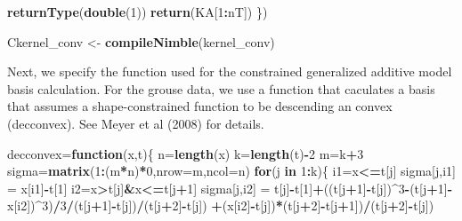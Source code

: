 \documentclass[11pt,]{article}
\newenvironment{Shaded}{\begin{snugshade}}{\end{snugshade}}
\newcommand{\KeywordTok}[1]{\textcolor[rgb]{0.13,0.29,0.53}{\textbf{#1}}}
\newcommand{\DataTypeTok}[1]{\textcolor[rgb]{0.13,0.29,0.53}{#1}}
\newcommand{\DecValTok}[1]{\textcolor[rgb]{0.00,0.00,0.81}{#1}}
\newcommand{\StringTok}[1]{\textcolor[rgb]{0.31,0.60,0.02}{#1}}
\newcommand{\ControlFlowTok}[1]{\textcolor[rgb]{0.13,0.29,0.53}{\textbf{#1}}}
\newcommand{\OperatorTok}[1]{\textcolor[rgb]{0.81,0.36,0.00}{\textbf{#1}}}
\newcommand{\NormalTok}[1]{#1}
\begin{document}
\begin{Shaded}
\begin{Highlighting}[]
    \KeywordTok{returnType}\NormalTok{(}\KeywordTok{double}\NormalTok{(}\DecValTok{1}\NormalTok{))}
    \KeywordTok{return}\NormalTok{(KA[}\DecValTok{1}\OperatorTok{:}\NormalTok{nT])}
\NormalTok{  \})}

\NormalTok{Ckernel_conv <-}\StringTok{ }\KeywordTok{compileNimble}\NormalTok{(kernel_conv)}
\end{Highlighting}
\end{Shaded}

Next, we specify the function used for the constrained generalized
additive model basis calculation. For the grouse data, we use a function
that caculates a basis that assumes a shape-constrained function to be
descending an convex (decconvex). See Meyer et al (2008) for details.

\begin{Shaded}
\begin{Highlighting}[]
\NormalTok{decconvex=}\ControlFlowTok{function}\NormalTok{(x,t)\{}
\NormalTok{  n=}\KeywordTok{length}\NormalTok{(x)}
\NormalTok{  k=}\KeywordTok{length}\NormalTok{(t)}\OperatorTok{-}\DecValTok{2}
\NormalTok{  m=k}\OperatorTok{+}\DecValTok{3}
\NormalTok{  sigma=}\KeywordTok{matrix}\NormalTok{(}\DecValTok{1}\OperatorTok{:}\NormalTok{(m}\OperatorTok{*}\NormalTok{n)}\OperatorTok{*}\DecValTok{0}\NormalTok{,}\DataTypeTok{nrow=}\NormalTok{m,}\DataTypeTok{ncol=}\NormalTok{n)}
  \ControlFlowTok{for}\NormalTok{(j }\ControlFlowTok{in} \DecValTok{1}\OperatorTok{:}\NormalTok{k)\{}
\NormalTok{    i1=x}\OperatorTok{<=}\NormalTok{t[j]}
\NormalTok{    sigma[j,i1] =}\StringTok{ }\NormalTok{x[i1]}\OperatorTok{-}\NormalTok{t[}\DecValTok{1}\NormalTok{]}
\NormalTok{    i2=x}\OperatorTok{>}\NormalTok{t[j]}\OperatorTok{&}\NormalTok{x}\OperatorTok{<=}\NormalTok{t[j}\OperatorTok{+}\DecValTok{1}\NormalTok{]}
\NormalTok{    sigma[j,i2] =}\StringTok{ }\NormalTok{t[j]}\OperatorTok{-}\NormalTok{t[}\DecValTok{1}\NormalTok{]}\OperatorTok{+}\NormalTok{((t[j}\OperatorTok{+}\DecValTok{1}\NormalTok{]}\OperatorTok{-}\NormalTok{t[j])}\OperatorTok{^}\DecValTok{3}\OperatorTok{-}\NormalTok{(t[j}\OperatorTok{+}\DecValTok{1}\NormalTok{]}\OperatorTok{-}\NormalTok{x[i2])}\OperatorTok{^}\DecValTok{3}\NormalTok{)}\OperatorTok{/}\DecValTok{3}\OperatorTok{/}\NormalTok{(t[j}\OperatorTok{+}\DecValTok{1}\NormalTok{]}\OperatorTok{-}\NormalTok{t[j])}\OperatorTok{/}\NormalTok{(t[j}\OperatorTok{+}\DecValTok{2}\NormalTok{]}\OperatorTok{-}\NormalTok{t[j]) }\OperatorTok{+}\NormalTok{(x[i2]}\OperatorTok{-}\NormalTok{t[j])}\OperatorTok{*}\NormalTok{(t[j}\OperatorTok{+}\DecValTok{2}\NormalTok{]}\OperatorTok{-}\NormalTok{t[j}\OperatorTok{+}\DecValTok{1}\NormalTok{])}\OperatorTok{/}\NormalTok{(t[j}\OperatorTok{+}\DecValTok{2}\NormalTok{]}\OperatorTok{-}\NormalTok{t[j])}

\end{Highlighting}
\end{Shaded}
\end{document}
